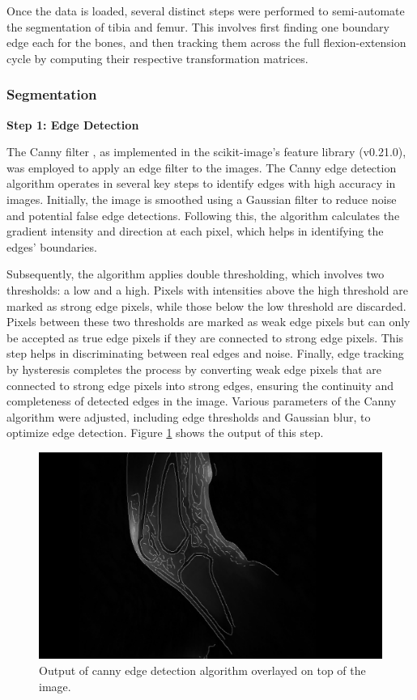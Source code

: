 \documentclass{micro-econ-thesis}
\begin{document}
Once the data is loaded, several distinct steps were performed to semi-automate the segmentation of tibia and femur. This involves first finding one boundary edge each for the bones, and then tracking them across the full flexion-extension cycle by computing their respective transformation matrices. 
 
\subsubsection{Segmentation}
\textbf{Step 1: Edge Detection}

The Canny filter \parencite{canny_computational_1986}, as implemented in the scikit-image's feature library (v0.21.0), was employed to apply an edge filter to the images. The Canny edge detection algorithm operates in several key steps to identify edges with high accuracy in images. Initially, the image is smoothed using a Gaussian filter to reduce noise and potential false edge detections. Following this, the algorithm calculates the gradient intensity and direction at each pixel, which helps in identifying the edges' boundaries.

Subsequently, the algorithm applies double thresholding, which involves two thresholds: a low and a high. Pixels with intensities above the high threshold are marked as strong edge pixels, while those below the low threshold are discarded. Pixels between these two thresholds are marked as weak edge pixels but can only be accepted as true edge pixels if they are connected to strong edge pixels. This step helps in discriminating between real edges and noise. Finally, edge tracking by hysteresis completes the process by converting weak edge pixels that are connected to strong edge pixels into strong edges, ensuring the continuity and completeness of detected edges in the image. Various parameters of the Canny algorithm were adjusted, including edge thresholds and Gaussian blur, to optimize edge detection. Figure \ref{fig:edgemitimg} shows the output of this step.  
\begin{figure}[H]
	\centering
	\includegraphics[width=0.7\linewidth]{edge_new}
	\caption{Output of canny edge detection algorithm overlayed on top of the image.}
	\label{fig:edgemitimg}
\end{figure}
\end{document}
